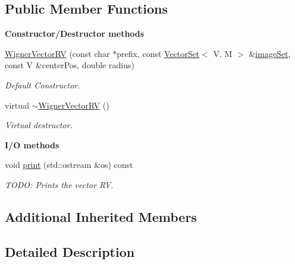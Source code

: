 \subsection*{Public Member Functions}
\begin{Indent}{\bf Constructor/\-Destructor methods}\par
\begin{DoxyCompactItemize}
\item 
\hyperlink{class_q_u_e_s_o_1_1_wigner_vector_r_v_ac2167c95fba84b2a3b9eff451bc2f64e}{Wigner\-Vector\-R\-V} (const char $\ast$prefix, const \hyperlink{class_q_u_e_s_o_1_1_vector_set}{Vector\-Set}$<$ V, M $>$ \&\hyperlink{class_q_u_e_s_o_1_1_base_vector_r_v_aa4dd2f036228eac1f945bacc7147a922}{image\-Set}, const V \&center\-Pos, double radius)
\begin{DoxyCompactList}\small\item\em Default Constructor. \end{DoxyCompactList}\item 
virtual \hyperlink{class_q_u_e_s_o_1_1_wigner_vector_r_v_ae3c14eb7f4b940dc5312d004eea3c832}{$\sim$\-Wigner\-Vector\-R\-V} ()
\begin{DoxyCompactList}\small\item\em Virtual destructor. \end{DoxyCompactList}\end{DoxyCompactItemize}
\end{Indent}
\begin{Indent}{\bf I/\-O methods}\par
\begin{DoxyCompactItemize}
\item 
void \hyperlink{class_q_u_e_s_o_1_1_wigner_vector_r_v_a6658542aa6a551c1b92de93558cb67fa}{print} (std\-::ostream \&os) const 
\begin{DoxyCompactList}\small\item\em T\-O\-D\-O\-: Prints the vector R\-V. \end{DoxyCompactList}\end{DoxyCompactItemize}
\end{Indent}
\subsection*{Additional Inherited Members}


\subsection{Detailed Description}
